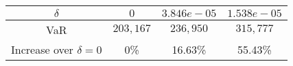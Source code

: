 \begin{center}
\begin{tabular}{c|c|c|c}
\(\delta\) & \(0\) & \(3.846e-05\) & \(1.538e-05\)\\
\hline
VaR & \(203,167\) & \(236,950\) & \(315,777\)\\
Increase over \(\delta=0\) & 0\% & 16.63\% & 55.43\%
\end{tabular}
\end{center}
 \label{table2}